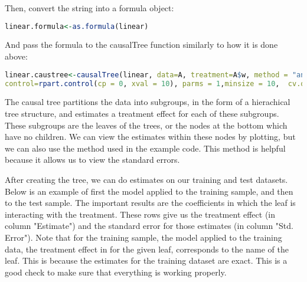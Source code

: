 \documentclass{article}
\begin{document}
Then, convert the string into a formula object:
\begin{lstlisting}[language=R]
linear.formula<-as.formula(linear) 
\end{lstlisting}


And pass the formula to the causalTree function similarly to how it is done above: \\
\begin{lstlisting}[language=R]
linear.caustree<-causalTree(linear, data=A, treatment=A$w, method = "anova", 
control=rpart.control(cp = 0, xval = 10), parms = 1,minsize = 10,  cv.option = "matching", p = 0.5)
\end{lstlisting}


The causal tree partitions the data into subgroups, in the form of a hierachical tree structure, and estimates a treatment effect for each of these subgroups. 
These subgroups are the leaves of the trees, or the nodes at the bottom which have no children. We can view the estimates within these nodes by plotting, but we can also use the method used in the example code. This method is helpful because it allows us to view the standard errors. 

After creating the tree, we can do estimates on our training and test datasets. Below is an example of first the model applied to the training sample, and then to the test sample. The important results are the coefficients in which  the leaf is interacting with the treatment. These rows give us the treatment effect (in column "Estimate") and the standard error for those estimates (in column "Std. Error"). Note that for the training sample, the model applied to the training data, the treatment effect in for the given leaf, corresponds to the name of the leaf. This is because the estimates for the training dataset are exact. This is a good check to make sure that everything is working properly. 
\end{document}
